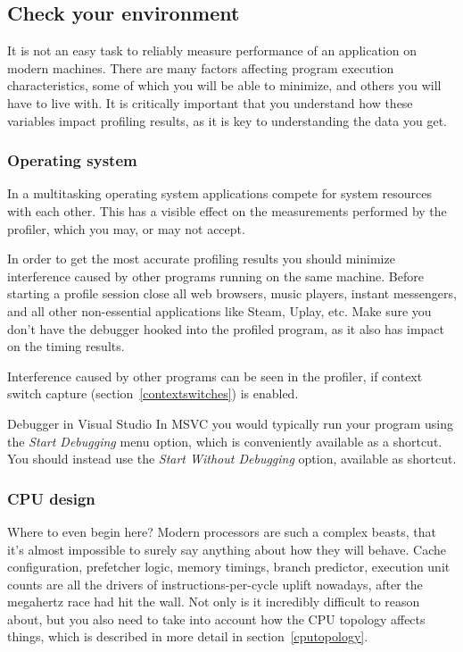 \documentclass[hidelinks,titlepage,a4paper]{article}
\begin{document}
\subsection{Check your environment}

It is not an easy task to reliably measure performance of an application on modern machines. There are many factors affecting program execution characteristics, some of which you will be able to minimize, and others you will have to live with. It is critically important that you understand how these variables impact profiling results, as it is key to understanding the data you get.

\subsubsection{Operating system}
\label{checkenvironmentos}

In a multitasking operating system applications compete for system resources with each other. This has a visible effect on the measurements performed by the profiler, which you may, or may not accept.

In order to get the most accurate profiling results you should minimize interference caused by other programs running on the same machine. Before starting a profile session close all web browsers, music players, instant messengers, and all other non-essential applications like Steam, Uplay, etc. Make sure you don't have the debugger hooked into the profiled program, as it also has impact on the timing results.

Interference caused by other programs can be seen in the profiler, if context switch capture (section~\ref{contextswitches}) is enabled.

\begin{bclogo}[
noborder=true,
couleur=black!5,
logo=\bclampe
]{Debugger in Visual Studio}
In MSVC you would typically run your program using the \emph{Start Debugging} menu option, which is conveniently available as a  shortcut. You should instead use the \emph{Start Without Debugging} option, available as  shortcut.
\end{bclogo}

\subsubsection{CPU design}
\label{checkenvironmentcpu}

Where to even begin here? Modern processors are such a complex beasts, that it's almost impossible to surely say anything about how they will behave. Cache configuration, prefetcher logic, memory timings, branch predictor, execution unit counts are all the drivers of instructions-per-cycle uplift nowadays, after the megahertz race had hit the wall. Not only is it incredibly difficult to reason about, but you also need to take into account how the CPU topology affects things, which is described in more detail in section~\ref{cputopology}.
\end{document}
